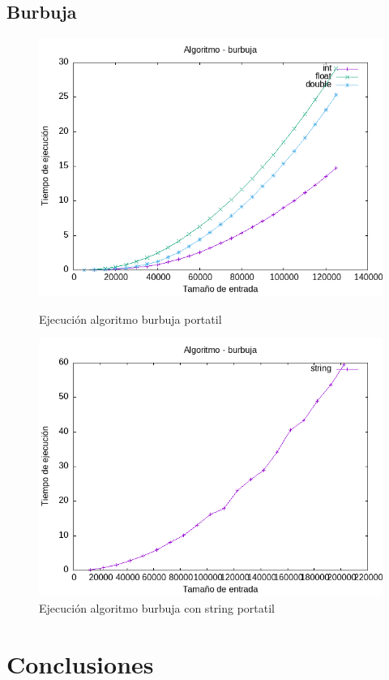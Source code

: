 \documentclass[11pt]{article}
\begin{document}
\subsection{Burbuja}
\begin{figure}[ht]
    \begin{minipage}{0.5\textwidth}
        \centering
        \includegraphics[width=\linewidth]{assets/Img/burbuja.png}
        \caption{Ejecución algoritmo burbuja portatil}
        \label{fig:photo1}
    \end{minipage}%
    \begin{minipage}{0.5\textwidth}
        \centering
        \includegraphics[width=\linewidth]{assets/Img/burbujastring.png}
        \caption{Ejecución algoritmo burbuja con string portatil}
        \label{fig:photo2}
    \end{minipage}
\end{figure}


\section{Conclusiones}
\end{document}
